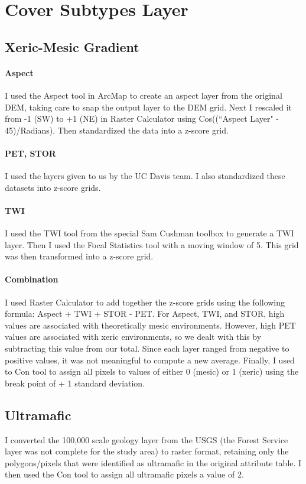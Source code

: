 \section{Cover  Subtypes Layer}
\subsection{Xeric-Mesic Gradient}
\paragraph{Aspect} I used the Aspect tool in ArcMap to create an aspect layer from the original DEM, taking care to snap the output layer to the DEM grid. Next I rescaled it from -1 (SW) to +1 (NE) in Raster Calculator using Cos((``Aspect Layer" - 45)/Radians). Then standardized the data into a z-score grid.
\paragraph{PET, STOR} I used the layers given to us by the UC Davis team. I also standardized these datasets into z-score grids.
\paragraph{TWI} I used the TWI tool from the special Sam Cushman toolbox to generate a TWI layer. Then I used the Focal Statistics tool with a moving window of 5. This grid was then transformed into a z-score grid.
\paragraph{Combination} I used Raster Calculator to add together the z-score grids using the following formula: Aspect + TWI + STOR - PET. For Aspect, TWI, and STOR, high values are associated with theoretically mesic environments. However, high PET values are associated with xeric environments, so we dealt with this by subtracting this value from our total. Since each layer ranged from negative to positive values, it was not meaningful to compute a new average. Finally, I used to Con tool to assign all pixels to values of either 0 (mesic) or 1 (xeric) using the break point of + 1 standard deviation.

\subsection{Ultramafic}
I converted the 100,000 scale geology layer from the USGS (the Forest Service layer was not complete for the study area) to raster format, retaining only the polygons/pixels that were identified as ultramafic in the original attribute table. I then used the Con tool to assign all ultramafic pixels a value of 2. 

